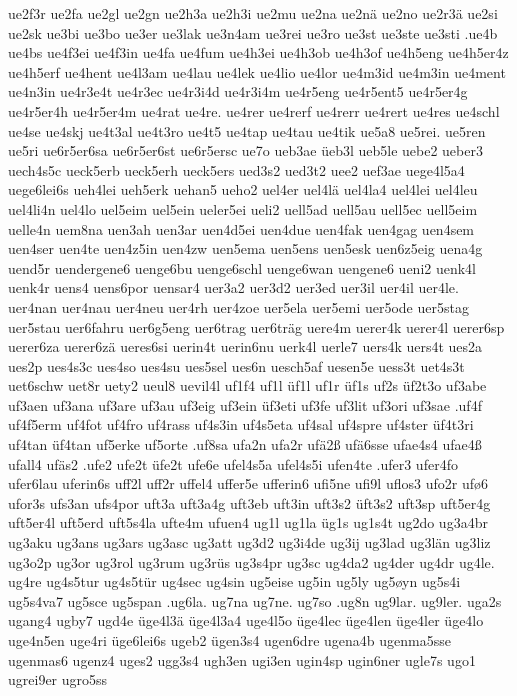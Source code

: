 {{ue2f3r
ue2fa
ue2gl
ue2gn
ue2h3a
ue2h3i
ue2mu
ue2na
ue2nä
ue2no
ue2r3ä
ue2si
ue2sk
ue3bi
ue3bo
ue3er
ue3lak
ue3n4am
ue3rei
ue3ro
ue3st
ue3ste
ue3sti
.ue4b
ue4bs
ue4f3ei
ue4f3in
ue4fa
ue4fum
ue4h3ei
ue4h3ob
ue4h3of
ue4h5eng
ue4h5er4z
ue4h5erf
ue4hent
ue4l3am
ue4lau
ue4lek
ue4lio
ue4lor
ue4m3id
ue4m3in
ue4ment
ue4n3in
ue4r3e4t
ue4r3ec
ue4r3i4d
ue4r3i4m
ue4r5eng
ue4r5ent5
ue4r5er4g
ue4r5er4h
ue4r5er4m
ue4rat
ue4re.
ue4rer
ue4rerf
ue4rerr
ue4rert
ue4res
ue4schl
ue4se
ue4skj
ue4t3al
ue4t3ro
ue4t5
ue4tap
ue4tau
ue4tik
ue5a8
ue5rei.
ue5ren
ue5ri
ue6r5er6sa
ue6r5er6st
ue6r5ersc
ue7o
ueb3ae
üeb3l
ueb5le
uebe2
ueber3
uech4s5c
ueck5erb
ueck5erh
ueck5ers
ued3s2
ued3t2
uee2
uef3ae
uege4l5a4
uege6lei6s
ueh4lei
ueh5erk
uehan5
ueho2
uel4er
uel4lä
uel4la4
uel4lei
uel4leu
uel4li4n
uel4lo
uel5eim
uel5ein
ueler5ei
ueli2
uell5ad
uell5au
uell5ec
uell5eim
uelle4n
uem8na
uen3ah
uen3ar
uen4d5ei
uen4due
uen4fak
uen4gag
uen4sem
uen4ser
uen4te
uen4z5in
uen4zw
uen5ema
uen5ens
uen5esk
uen6z5eig
uena4g
uend5r
uendergene6
uenge6bu
uenge6schl
uenge6wan
uengene6
ueni2
uenk4l
uenk4r
uens4
uens6por
uensar4
uer3a2
uer3d2
uer3ed
uer3il
uer4il
uer4le.
uer4nan
uer4nau
uer4neu
uer4rh
uer4zoe
uer5ela
uer5emi
uer5ode
uer5stag
uer5stau
uer6fahru
uer6g5eng
uer6trag
uer6träg
uere4m
uerer4k
uerer4l
uerer6sp
uerer6za
uerer6zä
ueres6si
uerin4t
uerin6nu
uerk4l
uerle7
uers4k
uers4t
ues2a
ues2p
ues4s3c
ues4so
ues4su
ues5sel
ues6n
uesch5af
uesen5e
uess3t
uet4s3t
uet6schw
uet8r
uety2
ueul8
uevil4l
uf1f4
uf1l
üf1l
uf1r
üf1s
uf2s
üf2t3o
uf3abe
uf3aen
uf3ana
uf3are
uf3au
uf3eig
uf3ein
üf3eti
uf3fe
uf3lit
uf3ori
uf3sae
.uf4f
uf4f5erm
uf4fot
uf4fro
uf4rass
uf4s3in
uf4s5eta
uf4sal
uf4spre
uf4ster
üf4t3ri
uf4tan
üf4tan
uf5erke
uf5orte
.uf8sa
ufa2n
ufa2r
ufä2ß
ufä6sse
ufae4s4
ufae4ß
ufall4
ufäs2
.ufe2
ufe2t
üfe2t
ufe6e
ufel4s5a
ufel4s5i
ufen4te
.ufer3
ufer4fo
ufer6lau
uferin6s
uff2l
uff2r
uffel4
uffer5e
ufferin6
ufi5ne
ufi9l
uflos3
ufo2r
ufø6
ufor3s
ufs3an
ufs4por
uft3a
uft3a4g
uft3eb
uft3in
uft3s2
üft3s2
uft3sp
uft5er4g
uft5er4l
uft5erd
uft5s4la
ufte4m
ufuen4
ug1l
ug1la
üg1s
ug1s4t
ug2do
ug3a4br
ug3aku
ug3ans
ug3ars
ug3asc
ug3att
ug3d2
ug3i4de
ug3ij
ug3lad
ug3län
ug3liz
ug3o2p
ug3or
ug3rol
ug3rum
ug3rüs
ug3s4pr
ug3sc
ug4da2
ug4der
ug4dr
ug4le.
ug4re
ug4s5tur
ug4s5tür
ug4sec
ug4sin
ug5eise
ug5in
ug5ly
ug5øyn
ug5s4i
ug5s4va7
ug5sce
ug5span
.ug6la.
ug7na
ug7ne.
ug7so
.ug8n
ug9lar.
ug9ler.
uga2s
ugang4
ugby7
ugd4e
üge4l3ä
üge4l3a4
uge4l5o
üge4lec
üge4len
üge4ler
üge4lo
uge4n5en
uge4ri
üge6lei6s
ugeb2
ügen3s4
ugen6dre
ugena4b
ugenma5sse
ugenmas6
ugenz4
uges2
ugg3s4
ugh3en
ugi3en
ugin4sp
ugin6ner
ugle7s
ugo1
ugrei9er
ugro5ss
}}

